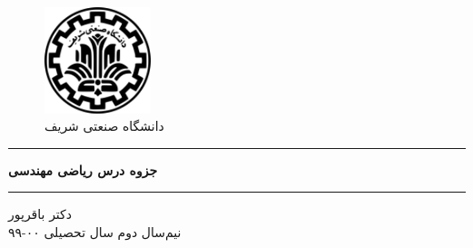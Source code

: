 \begin{center}
	\null
	\vspace{1cm}
\begin{figure}[H]
	\centering
	\includegraphics[width=0.275\textwidth]{sharif-logo-fa.png}
	\caption*{دانشگاه صنعتی شریف\\
		\large{
}
}
\end{figure}
\vspace{1cm}
\hrule
\vspace{.5cm}
\fontsize{26}{26}\textbf{
جزوه درس ریاضی مهندسی\\
}
\vspace{.5cm}
\hrule
\vspace{.5cm}
\vspace{1.5cm}
\normalfont
\Large{
دکتر باقرپور\\}
\vspace{1.5 cm}
\normalsize
\vfill{نیم‌سال دوم سال تحصیلی ۰۰-۹۹}
\end{center}
\thispagestyle{empty}